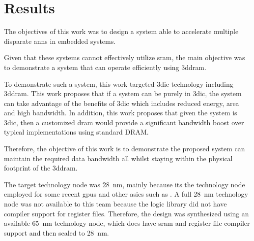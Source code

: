 
\chapter{Results}
\label{sec:Results}
The objectives of this work was to design a system able to accelerate multiple disparate \acp{ann} in embedded systems.
\iffalse
This means systems that are not designed to process multiple requests of essentially the same operation.
\fi
Given that these systems cannot effectively utilize \ac{sram}, the main objective was to demonstrate a system that can operate efficiently using \ac{3ddram}.
\iffalse
The system decodes instructions, sends configuration to various functions, pre-fetchs and pipelines data.
This parallelism allows the system to constantly stream data whilst results from previous operations are being operated on.
\fi

To demonstrate such a system, this work targeted \ac{3dic} technology including \ac{3ddram}. This work proposes that if a system can be purely in \ac{3dic}, the system can take advantage of the benefits
of \ac{3dic} which includes reduced energy, area and high bandwidth.
In addition, this work proposes that given the system is \ac{3dic}, then a customized \ac{dram} would provide a significant bandwidth boost over typical implementations using standard DRAM.
\iffalse
To ensure the system was purely \ac{3dic}, the area of the system Manager and Processing Engine has to stay within the physical footprint of the \ac{3ddram}.
\fi

Therefore, the objective of this work is to demonstrate the proposed system can maintain the required data bandwidth all whilst staying within the physical footprint of the \ac{3ddram}. 


The target technology node was \SI{28}{\nano\meter}, mainly because its the technology node employed for some recent \acp{gpu} and other \acp{asic} such as \cite{jouppi2017datacenter}.
A full \SI{28}{\nano\meter} technology node was not available to this team because the logic library did not have compiler support for register files.
Therefore, the design was synthesized using an available \SI{65}{\nano\meter} technology node, which does have \ac{sram} and register file compiler support and then scaled to \SI{28}{\nano\meter}.

